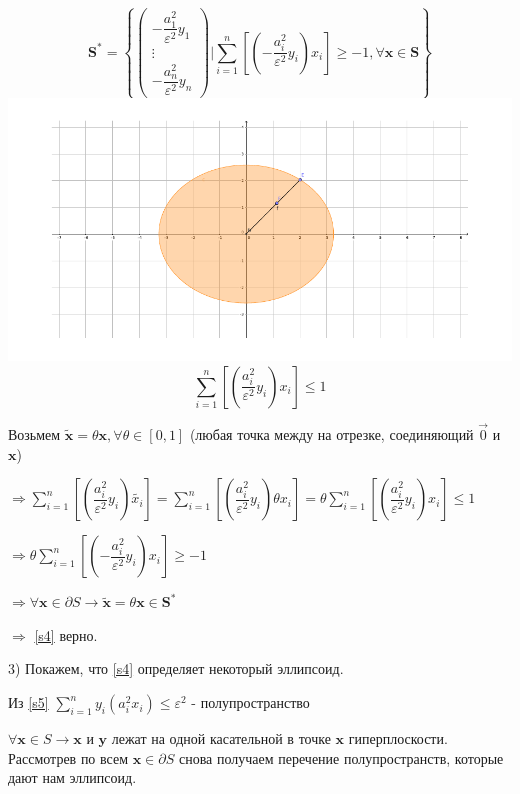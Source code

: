 \documentclass[a4paper,12pt]{article}
\newcommand{\lt}{\left}
\newcommand{\rt}{\right}
\begin{document}
	\begin{equation}\label{s4}
	\mathbf{S}^* = \lt\{ \begin{pmatrix}
	-\dfrac{a_1^2}{\varepsilon^2} y_1\\
	\vdots\\
	-\dfrac{a_n^2}{\varepsilon^2} y_n
	\end{pmatrix}
	\Big| \sum\limits_{i=1}^{n}\lt[\lt(-\dfrac{a_i^2}{\varepsilon^2} y_i\rt)x_i\rt] \ge -1, \forall \mathbf{x} \in  \mathbf{S} \rt\} 
	\end{equation}
	\includegraphics[width=\textwidth]{image3_problem4.pdf}
	\begin{equation}\label{s5}
	\sum\limits_{i=1}^{n}\lt[\lt(\dfrac{a_i^2}{\varepsilon^2} y_i\rt)x_i\rt] \le 1
	\end{equation}
	
	Возьмем $\mathbf{\widetilde{x}} = \theta \mathbf{x}, \forall \theta \in [0,1]$ (любая точка между на отрезке, соединяющий $\vec{0}$ и $\mathbf{x}$)
	
	$\Rightarrow \sum\limits_{i=1}^{n}\lt[\lt(\dfrac{a_i^2}{\varepsilon^2} y_i\rt)\widetilde{x_i}\rt] =\sum\limits_{i=1}^{n}\lt[\lt(\dfrac{a_i^2}{\varepsilon^2} y_i\rt)\theta x_i\rt]= \theta\sum\limits_{i=1}^{n}\lt[\lt(\dfrac{a_i^2}{\varepsilon^2} y_i\rt) x_i\rt] \le 1$
	
	$\Rightarrow \theta\sum\limits_{i=1}^{n}\lt[\lt(-\dfrac{a_i^2}{\varepsilon^2} y_i\rt) x_i\rt] \ge -1$
	
	$\Rightarrow \forall \mathbf{x} \in \partial S  \rightarrow \mathbf{\widetilde{x}} = \theta \mathbf{x} \in \mathbf{S^*}$
	
	 $\Rightarrow$ \eqref{s4} верно.
	 
	3) Покажем, что \eqref{s4} определяет некоторый эллипсоид.
	
	
	Из \eqref{s5} $\sum\limits_{i=1}^{n} y_i \lt(a_i^2 x_i\rt) \le \varepsilon^2$ - полупространство
	
	$\forall \mathbf{x} \in S \rightarrow \mathbf{x}\text{ и } \mathbf{y}$ лежат на одной касательной в точке $\mathbf{x}$ гиперплоскости.
	Рассмотрев по всем $\mathbf{x} \in \partial S$ снова получаем перечение полупространств, которые дают нам эллипсоид. 
	 
 
	
	
\end{document}
